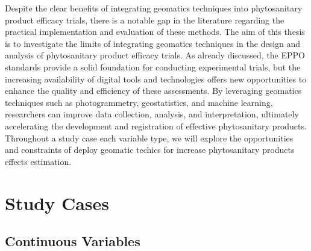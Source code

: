 \documentclass[12pt,a4paper,oneside]{report}
\begin{document}
Despite the clear benefits of integrating geomatics techniques into phytosanitary
product efficacy trials, there is a notable gap in the literature regarding the
practical implementation and evaluation of these methods. 
The aim of this thesis is to investigate the limits of integrating
geomatics techniques in the design and analysis of phytosanitary product efficacy trials.
As already discussed, the EPPO standards provide a solid foundation for conducting experimental trials,
but the increasing availability of digital tools and technologies offers new opportunities to enhance
the quality and efficiency of these assessments. By leveraging geomatics techniques such as photogrammetry,
geostatistics, and machine learning, researchers can improve data collection, analysis, and interpretation,
ultimately accelerating the development and registration of effective phytosanitary products.
Throughout a study case each variable type, we will explore the opportunities and
constraints of deploy geomatic techics for increase phytosanitary products effects
estimation.




\chapter{Study Cases}
\section{Continuous Variables}














\end{document}
